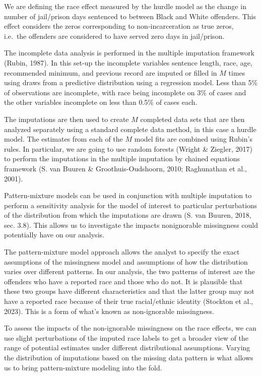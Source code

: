 \documentclass[
  letterpaper,
  DIV=11,
  numbers=noendperiod]{scrartcl}
\begin{document}
We are defining the race effect measured by the hurdle model as the
change in number of jail/prison days sentenced to between Black and
White offenders. This effect considers the zeros corresponding to
non-incarceration as true zeros, i.e.~the offenders are considered to
have served zero days in jail/prison.

The incomplete data analysis is performed in the multiple imputation
framework (Rubin, 1987). In this set-up the incomplete variables
sentence length, race, age, recommended minimum, and previous record are
imputed or filled in \(M\) times using draws from a predictive
distribution using a regression model. Less than 5\% of observations are
incomplete, with race being incomplete on 3\% of cases and the other
variables incomplete on less than 0.5\% of cases each.

The imputations are then used to create \(M\) completed data sets that
are then analyzed separately using a standard complete data method, in
this case a hurdle model. The estimates from each of the \(M\) model
fits are combined using Rubin's rules. In particular, we are going to
use random forests (Wright \& Ziegler, 2017) to perform the imputations
in the multiple imputation by chained equations framework (S. van Buuren
\& Groothuis-Oudshoorn, 2010; Raghunathan et al., 2001).

Pattern-mixture models can be used in conjunction with multiple
imputation to perform a sensitivity analysis for the model of interest
to particular perturbations of the distribution from which the
imputations are drawn (S. van Buuren, 2018, sec. 3.8). This allows us to
investigate the impacts nonignorable missingness could potentially have
on our analysis.

The pattern-mixture model approach allows the analyst to specify the
exact assumptions of the missingness model and assumptions of how the
distribution varies over different patterns. In our analysis, the two
patterns of interest are the offenders who have a reported race and
those who do not. It is plausible that these two groups have different
characteristics and that the latter group may not have a reported race
because of their true racial/ethnic identity (Stockton et al., 2023).
This is a form of what's known as non-ignorable missingness.

To assess the impacts of the non-ignorable missingness on the race
effects, we can use slight perturbations of the imputed race labels to
get a broader view of the range of potential estimates under different
distributional assumptions. Varying the distribution of imputations
based on the missing data pattern is what allows us to bring
pattern-mixture modeling into the fold.
\end{document}
